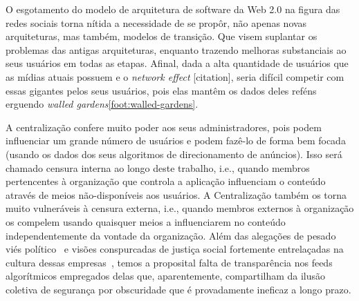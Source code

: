 


O esgotamento do modelo de arquitetura de software da Web 2.0 na figura das redes sociais torna nítida a necessidade de se propôr, não apenas novas arquiteturas, mas também, modelos de transição.
Que visem suplantar os problemas das antigas arquiteturas, enquanto trazendo melhoras substanciais ao seus usuários em todas as etapas.
Afinal, dada a alta quantidade de usuários que as mídias atuais possuem e o \textit{network effect} [citation], seria difícil competir com essas gigantes pelos seus usuários, pois elas mantêm os dados deles reféns erguendo \textit{walled gardens}\ref{foot:walled-gardens}.

A centralização confere muito poder aos seus administradores, pois podem influenciar um grande número de usuários e podem fazê-lo de forma bem focada (usando os dados dos seus algoritmos de direcionamento de anúncios).
Isso será chamado censura interna ao longo deste trabalho, i.e., quando membros pertencentes à organização que controla a aplicação influenciam o conteúdo através de meios não-disponíveis aos usuários.
A Centralização também os torna muito vulneráveis à censura externa, i.e., quando membros externos à organização os compelem usando quaisquer meios a influenciarem no conteúdo independentemente da vontade da organização.
Além das alegações de pesado viés político~\cite{TLIB} e visões conspurcadas de justiça social fortemente entrelaçadas na cultura dessas empresas~\cite{DAMORE}, temos a proposital falta de transparência nos feeds algorítmicos empregados delas que, aparentemente, compartilham da ilusão coletiva de segurança por obscuridade que é provadamente ineficaz a longo prazo.

